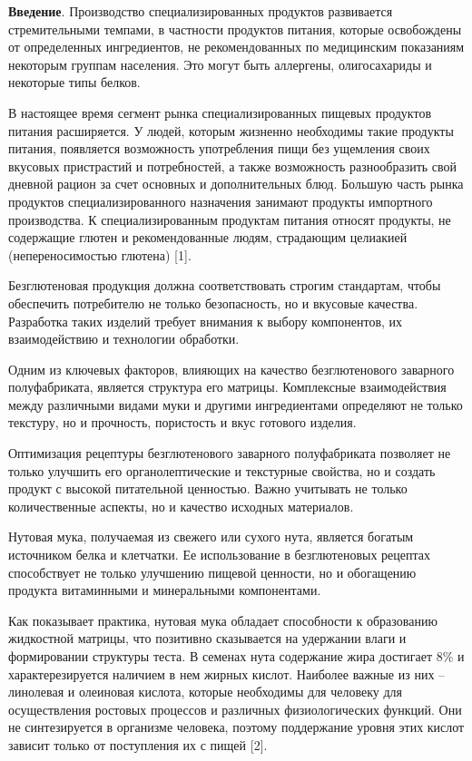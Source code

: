 \begin{multicols}{2}
{\bfseries Введение}. Производство специализированных продуктов развивается
стремительными темпами, в частности продуктов питания, которые
освобождены от определенных ингредиентов, не рекомендованных по
медицинским показаниям некоторым группам населения. Это могут быть
аллергены, олигосахариды и некоторые типы белков.

В настоящее время сегмент рынка специализированных пищевых продуктов
питания расширяется. У людей, которым жизненно необходимы такие продукты
питания, появляется возможность употребления пищи без ущемления своих
вкусовых пристрастий и потребностей, а также возможность разнообразить
свой дневной рацион за счет основных и дополнительных блюд. Большую
часть рынка продуктов специализированного назначения занимают продукты
импортного производства. К специализированным продуктам питания относят
продукты, не содержащие глютен и рекомендованные людям, страдающим
целиакией (непереносимостью глютена) {[}1{]}.

Безглютеновая продукция должна соответствовать строгим стандартам, чтобы
обеспечить потребителю не только безопасность, но и вкусовые качества.
Разработка таких изделий требует внимания к выбору компонентов, их
взаимодействию и технологии обработки.

Одним из ключевых факторов, влияющих на качество безглютенового
заварного полуфабриката, является структура его матрицы. Комплексные
взаимодействия между различными видами муки и другими ингредиентами
определяют не только текстуру, но и прочность, пористость и вкус
готового изделия.

Оптимизация рецептуры безглютенового заварного полуфабриката позволяет
не только улучшить его органолептические и текстурные свойства, но и
создать продукт с высокой питательной ценностью. Важно учитывать не
только количественные аспекты, но и качество исходных материалов.

Нутовая мука, получаемая из свежего или сухого нута, является богатым
источником белка и клетчатки. Ее использование в безглютеновых рецептах
способствует не только улучшению пищевой ценности, но и обогащению
продукта витаминными и минеральными компонентами.

Как показывает практика, нутовая мука обладает способности к образованию
жидкостной матрицы, что позитивно сказывается на удержании влаги и
формировании структуры теста. В семенах нута содержание жира достигает
8\% и характерезируется наличием в нем жирных кислот. Наиболее важные из
них -- линолевая и олеиновая кислота, которые необходимы для человеку
для осуществления ростовых процессов и различных физиологических
функций. Они не синтезируется в организме человека, поэтому поддержание
уровня этих кислот зависит только от поступления их с пищей {[}2{]}.


\end{multicols}
